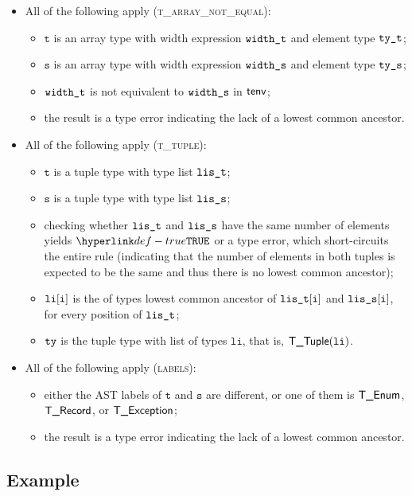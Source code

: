 \documentclass{book}
\newcommand\vt[0]{\texttt{t}}
\newcommand\vs[0]{\texttt{s}}
\newcommand\vli[0]{\texttt{li}}
\begin{document}
\begin{itemize}
\begin{itemize}
    \item All of the following apply (\textsc{t\_array\_not\_equal}):
    \begin{itemize}
      \item $\vt$ is an array type with width expression $\texttt{width\_t}$ and element type $\texttt{ty\_t}$;
      \item $\vs$ is an array type with width expression $\texttt{width\_s}$ and element type $\texttt{ty\_s}$;
      \item $\texttt{width\_t}$ is not equivalent to $\texttt{width\_s}$ in $\textsf{tenv}$;
      \item the result is a type error indicating the lack of a lowest common ancestor.
    \end{itemize}

    \item All of the following apply (\textsc{t\_tuple}):
    \begin{itemize}
      \item $\vt$ is a tuple type with type list $\texttt{lis\_t}$;
      \item $\vs$ is a tuple type with type list $\texttt{lis\_s}$;
      \item checking whether $\texttt{lis\_t}$ and $\texttt{lis\_s}$ have the same number of elements yields $\True$
            or a type error, which short-circuits the entire rule (indicating that the number of elements in both tuples is expected
            to be the same and thus there is no lowest common ancestor);
      \item $\vli[\vi]$ is the of types lowest common ancestor of $\texttt{lis\_t}[\texttt{i}]$ and $\texttt{lis\_s}[\texttt{i}]$, for every position of $\texttt{lis\_t}$;
      \item $\texttt{ty}$ is the tuple type with list of types $\vli$, that is, $\TTuple(\vli)$.
    \end{itemize}

    \item All of the following apply (\textsc{labels}):
    \begin{itemize}
      \item either the AST labels of $\vt$ and $\vs$ are different, or one of them is $\textsf{T\_Enum}$, $\textsf{T\_Record}$, or $\textsf{T\_Exception}$;
      \item the result is a type error indicating the lack of a lowest common ancestor.
    \end{itemize}
  \end{itemize}
\end{itemize}

\subsection{Example}
\end{document}
